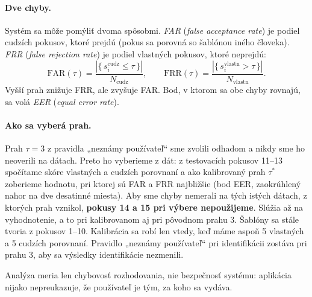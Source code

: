 \paragraph{Dve chyby.}
Systém sa môže pomýliť dvoma spôsobmi. \emph{FAR} (\emph{false acceptance rate})
je podiel cudzích pokusov, ktoré prejdú (pokus sa porovná so šablónou iného
človeka). \emph{FRR} (\emph{false rejection rate}) je podiel vlastných pokusov,
ktoré neprejdú:
\begin{equation}
  \label{eq:farfrr}
  \mathrm{FAR}(\tau) = \frac{\left|\{\,s_i^{\mathrm{cudz}} \le \tau\,\}\right|}{N_{\mathrm{cudz}}},
  \qquad
  \mathrm{FRR}(\tau) = \frac{\left|\{\,s_i^{\mathrm{vlastn}} > \tau\,\}\right|}{N_{\mathrm{vlastn}}}.
\end{equation}
Vyšší prah znižuje FRR, ale zvyšuje FAR. Bod, v ktorom sa obe chyby rovnajú, sa
volá \emph{EER} (\emph{equal error rate}).

\paragraph{Ako sa vyberá prah.}
Prah $\tau = 3$ z pravidla „neznámy používateľ“ sme zvolili odhadom a nikdy sme
ho neoverili na dátach. Preto ho vyberieme z dát: z testovacích pokusov 11--13
spočítame skóre vlastných a cudzích porovnaní a ako kalibrovaný prah $\tau^{*}$
zoberieme hodnotu, pri ktorej sú FAR a FRR najbližšie (bod EER, zaokrúhlený
nahor na dve desatinné miesta). Aby sme chyby nemerali na tých istých dátach,
z ktorých prah vznikol, \textbf{pokusy 14 a 15 pri výbere nepoužijeme}. Slúžia
až na vyhodnotenie, a to pri kalibrovanom aj pri pôvodnom prahu 3. Šablóny sa
stále tvoria z pokusov 1--10. Kalibrácia sa robí len vtedy, keď máme aspoň 5
vlastných a 5 cudzích porovnaní. Pravidlo „neznámy používateľ“ pri
identifikácii zostáva pri prahu 3, aby sa výsledky identifikácie nezmenili.

Analýza meria len chybovosť rozhodovania, nie bezpečnosť systému: aplikácia
nijako nepreukazuje, že používateľ je tým, za koho sa vydáva.
